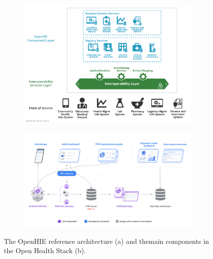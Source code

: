 \documentclass[
  authoryear]{elsarticle}
\begin{document}
\begin{figure}

\begin{minipage}{\linewidth}

\begin{figure}[H]

{\centering \includegraphics{openhie.png}

}


\end{figure}%

\end{minipage}%
\newline
\begin{minipage}{\linewidth}

\begin{figure}[H]

{\centering \includegraphics{ohs-endtoend.png}

}


\end{figure}%

\end{minipage}%

\caption{\label{fig-openhie}The OpenHIE reference architecture (a) and
themain components in the Open Health Stack (b).}

\end{figure}%
\end{document}
